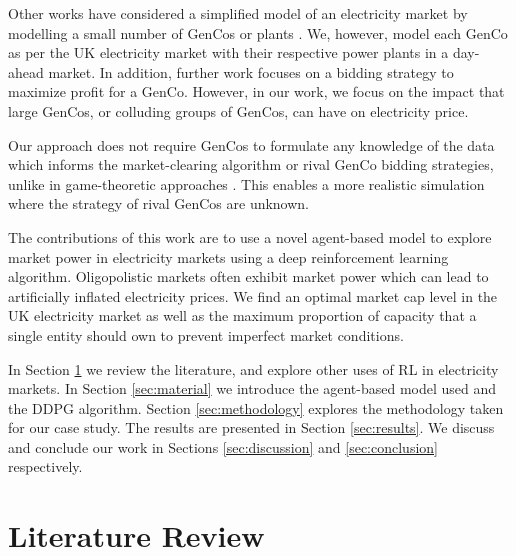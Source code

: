\documentclass[conference]{IEEEtran}
\begin{document}
Other works have considered a simplified model of an electricity market by modelling a small number of GenCos or plants \cite{EsmaeiliAliabadi2017,Tellidou2007}. We, however, model each GenCo as per the UK electricity market with their respective power plants in a day-ahead market. In addition, further work focuses on a bidding strategy to maximize profit for a GenCo. However, in our work, we focus on the impact that large GenCos, or colluding groups of GenCos, can have on electricity price.


Our approach does not require GenCos to formulate any knowledge of the data which informs the market-clearing algorithm or rival GenCo bidding strategies, unlike in game-theoretic approaches \cite{Wang2011}. This enables a more realistic simulation where the strategy of rival GenCos are unknown.

The contributions of this work are to use a novel agent-based model to explore market power in electricity markets using a deep reinforcement learning algorithm. Oligopolistic markets often exhibit market power which can lead to artificially inflated electricity prices. We find an optimal market cap level in the UK electricity market as well as the maximum proportion of capacity that a single entity should own to prevent imperfect market conditions.

In Section \ref{sec:lit-review} we review the literature, and explore other uses of RL in electricity markets. In Section \ref{sec:material} we introduce the agent-based model used and the DDPG algorithm. Section \ref{sec:methodology} explores the methodology taken for our case study. The results are presented in Section \ref{sec:results}. We discuss and conclude our work in Sections \ref{sec:discussion} and \ref{sec:conclusion} respectively. 














\section{Literature Review}
\label{sec:lit-review}
\end{document}
